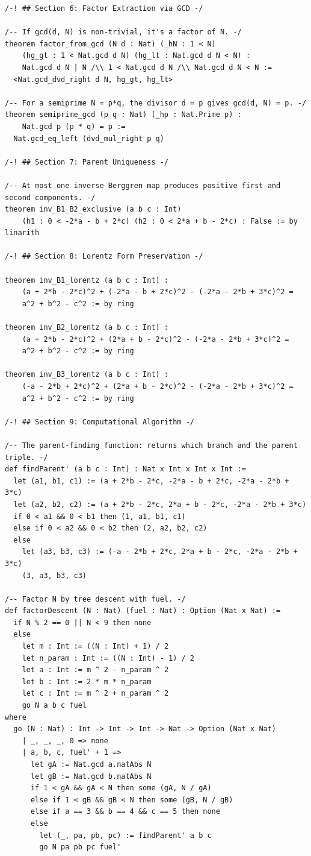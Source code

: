 \documentclass[11pt,openright,twoside]{book}
\theoremstyle{definition}
\begin{document}
\begin{lstlisting}[style=lean]
/-! ## Section 6: Factor Extraction via GCD -/

/-- If gcd(d, N) is non-trivial, it's a factor of N. -/
theorem factor_from_gcd (N d : Nat) (_hN : 1 < N)
    (hg_gt : 1 < Nat.gcd d N) (hg_lt : Nat.gcd d N < N) :
    Nat.gcd d N | N /\\ 1 < Nat.gcd d N /\\ Nat.gcd d N < N :=
  <Nat.gcd_dvd_right d N, hg_gt, hg_lt>

/-- For a semiprime N = p*q, the divisor d = p gives gcd(d, N) = p. -/
theorem semiprime_gcd (p q : Nat) (_hp : Nat.Prime p) :
    Nat.gcd p (p * q) = p :=
  Nat.gcd_eq_left (dvd_mul_right p q)

/-! ## Section 7: Parent Uniqueness -/

/-- At most one inverse Berggren map produces positive first and second components. -/
theorem inv_B1_B2_exclusive (a b c : Int)
    (h1 : 0 < -2*a - b + 2*c) (h2 : 0 < 2*a + b - 2*c) : False := by linarith

/-! ## Section 8: Lorentz Form Preservation -/

theorem inv_B1_lorentz (a b c : Int) :
    (a + 2*b - 2*c)^2 + (-2*a - b + 2*c)^2 - (-2*a - 2*b + 3*c)^2 =
    a^2 + b^2 - c^2 := by ring

theorem inv_B2_lorentz (a b c : Int) :
    (a + 2*b - 2*c)^2 + (2*a + b - 2*c)^2 - (-2*a - 2*b + 3*c)^2 =
    a^2 + b^2 - c^2 := by ring

theorem inv_B3_lorentz (a b c : Int) :
    (-a - 2*b + 2*c)^2 + (2*a + b - 2*c)^2 - (-2*a - 2*b + 3*c)^2 =
    a^2 + b^2 - c^2 := by ring

/-! ## Section 9: Computational Algorithm -/

/-- The parent-finding function: returns which branch and the parent triple. -/
def findParent' (a b c : Int) : Nat x Int x Int x Int :=
  let (a1, b1, c1) := (a + 2*b - 2*c, -2*a - b + 2*c, -2*a - 2*b + 3*c)
  let (a2, b2, c2) := (a + 2*b - 2*c, 2*a + b - 2*c, -2*a - 2*b + 3*c)
  if 0 < a1 && 0 < b1 then (1, a1, b1, c1)
  else if 0 < a2 && 0 < b2 then (2, a2, b2, c2)
  else
    let (a3, b3, c3) := (-a - 2*b + 2*c, 2*a + b - 2*c, -2*a - 2*b + 3*c)
    (3, a3, b3, c3)

/-- Factor N by tree descent with fuel. -/
def factorDescent (N : Nat) (fuel : Nat) : Option (Nat x Nat) :=
  if N % 2 == 0 || N < 9 then none
  else
    let m : Int := ((N : Int) + 1) / 2
    let n_param : Int := ((N : Int) - 1) / 2
    let a : Int := m ^ 2 - n_param ^ 2
    let b : Int := 2 * m * n_param
    let c : Int := m ^ 2 + n_param ^ 2
    go N a b c fuel
where
  go (N : Nat) : Int -> Int -> Int -> Nat -> Option (Nat x Nat)
    | _, _, _, 0 => none
    | a, b, c, fuel' + 1 =>
      let gA := Nat.gcd a.natAbs N
      let gB := Nat.gcd b.natAbs N
      if 1 < gA && gA < N then some (gA, N / gA)
      else if 1 < gB && gB < N then some (gB, N / gB)
      else if a == 3 && b == 4 && c == 5 then none
      else
        let (_, pa, pb, pc) := findParent' a b c
        go N pa pb pc fuel'


\end{lstlisting}
\end{document}
